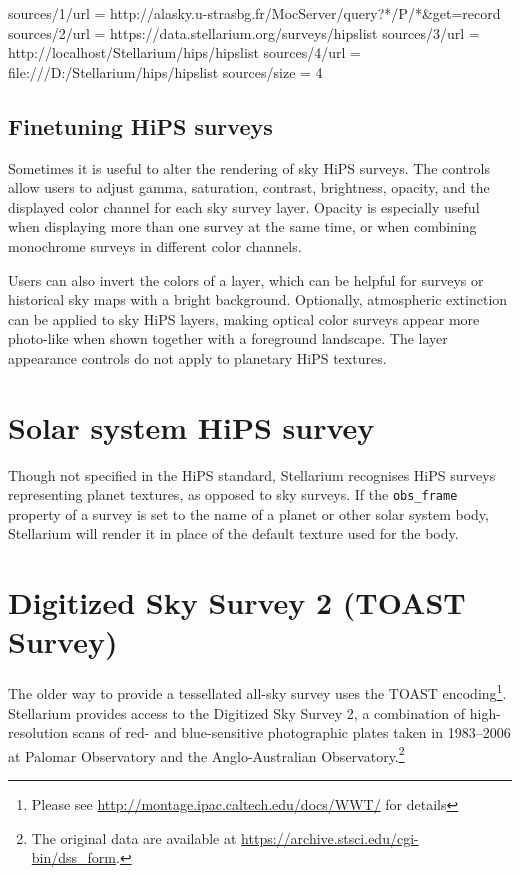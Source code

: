 \begin{configfile}[\scriptsize]
[hips]
sources/1/url = http://alasky.u-strasbg.fr/MocServer/query?*/P/*&get=record
sources/2/url = https://data.stellarium.org/surveys/hipslist
sources/3/url = http://localhost/Stellarium/hips/hipslist
sources/4/url = file:///D:/Stellarium/hips/hipslist
sources/size  = 4
\end{configfile}

\subsection{Finetuning HiPS surveys}
Sometimes it is useful to alter the rendering of sky HiPS surveys. The
 controls  allow users to adjust
gamma, saturation, contrast, brightness, opacity, and the displayed color
channel for each sky survey layer. Opacity is especially useful when displaying
more than one survey at the same time, or when combining monochrome surveys in
different color channels.

Users can also invert the colors of a layer, which can be helpful for surveys
or historical sky maps with a bright background. Optionally, atmospheric
extinction can be applied to sky HiPS layers, making optical color surveys
appear more photo-like when shown together with a foreground landscape. The
layer appearance controls do not apply to planetary HiPS textures.


\section{Solar system HiPS survey}

Though not specified in the HiPS standard, Stellarium recognises HiPS surveys
representing planet textures, as opposed to sky surveys.  If the
\texttt{obs\_frame} property of a survey is set to the name of a planet or
other solar system body, Stellarium will render it in place of the default
texture used for the body.


\section{Digitized Sky Survey 2 (TOAST Survey)}
\label{sec:TOAST}

The older way to provide a tessellated all-sky survey uses the TOAST
encoding\footnote{Please see
  \url{http://montage.ipac.caltech.edu/docs/WWT/} for details}.
Stellarium provides access to the Digitized Sky Survey 2, a
combination of high-resolution scans of red- and blue-sensitive
photographic plates taken in 1983--2006 at Palomar Observatory and the
Anglo-Australian Observatory.\footnote{The original data are available
  at \url{https://archive.stsci.edu/cgi-bin/dss_form}.}

